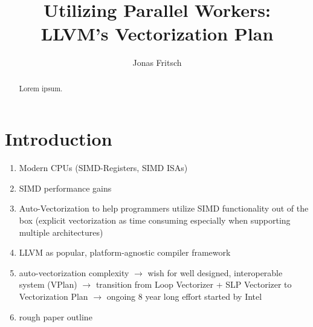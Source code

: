 \documentclass[sigplan,11pt,nonacm]{acmart}
\begin{document}
\title{Utilizing Parallel Workers: \\LLVM's Vectorization Plan}
\author{Jonas Fritsch}

\begin{abstract}
Lorem ipsum.
\end{abstract}

\maketitle



\section{Introduction}
\label{sec:introduction}

\begin{enumerate}
  \item Modern CPUs (SIMD-Registers, SIMD ISAs)
  \item SIMD performance gains
  \item Auto-Vectorization to help programmers utilize SIMD functionality out of the box 
  (explicit vectorization as time consuming especially when supporting multiple architectures)
  \item LLVM as popular, platform-agnostic compiler framework~\cite{10.5555/977395.977673}
  \item auto-vectorization complexity $\rightarrow$ wish for well designed, 
  interoperable system (VPlan) $\rightarrow$ transition from Loop Vectorizer + SLP Vectorizer to 
  Vectorization Plan $\rightarrow$ ongoing 8 year long effort started by Intel
  \item rough paper outline
\end{enumerate}


\end{document}
